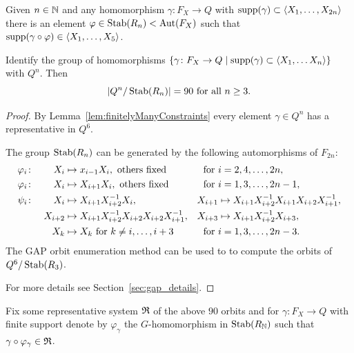 \documentclass[a4paper,11pt]{amsart}
\begin{document}
\begin{lem}\label{lem:finitelyManyConstraints}
 Given $n\in \mathbb{N}$ and any homomorphism $\gamma\colon F_X \to Q$ with $\operatorname{{supp}}(\gamma) \subset \left<X_1,\ldots ,X_{2n}\right>$
 there is an element $\varphi \in \operatorname{Stab}(R_n)<\operatorname{{Aut}}(F_X)$ such that $\operatorname{{supp}}(\gamma\circ\varphi) \in \left<X_1,\ldots,X_5\right>$.
\end{lem}
\begin{lem}\label{lem:90Constraints}
 Identify the group of homomorphisms $\{\gamma \colon F_X \to Q \mid \operatorname{{supp}}(\gamma) \subset \left<X_1,\ldots X_n\right>\}$ with $Q^n$. 
 Then \[\left|{Q^n/\operatorname{Stab}(R_n)}\right|=90 \text{ for all } n\geq 3	.\]
\end{lem}
\begin{proof}
By Lemma~\ref{lem:finitelyManyConstraints} every element $\gamma\in Q^n$ has a representative in $Q^6$.

 The group $\operatorname{Stab}(R_n)$ can be generated by the 
 following automorphisms of $F_{2n}$:
 \begin{align*}
  \varphi_i&\colon& X_i&\mapsto x_{i-1}X_i, \textup{ others fixed} & \textup{for }&i=2,4,\ldots,2n , \\
  \varphi_i&\colon&X_i&\mapsto X_{i+1}X_i, \textup{ others fixed} & \textup{for }&i=1,3,\ldots,2n-1 ,\\
  \psi_i&\colon&X_i&\mapsto X_{i+1}X_{i+2}^{-1}X_i, &X_{i+1}&\mapsto X_{i+1}X_{i+2}^{-1}X_{i+1}X_{i+2}X_{i+1}^{-1},\\  
  &&X_{i+2}&\mapsto X_{i+1}X_{i+2}^{-1}X_{i+2}X_{i+2}X_{i+1}^{-1}, &X_{i+3}&\mapsto X_{i+1}X_{i+2}^{-1}X_{i+3},\\
  &&X_k &\mapsto X_k \textup{ for } k\neq i,\ldots,i+3 & \textup{for }&i=1,3,\ldots,2n-3 .  
 \end{align*}
 The GAP orbit enumeration method  can be used to 
 to compute the orbits of ${Q^6/\operatorname{Stab}(R_3)}$.
 
 For more details see Section~\ref{sec:gap_details}.
\end{proof}
 Fix some representative system $\mathfrak{R}$ of the above $90$ orbits and for 
 $\gamma \colon F_X \to Q$ with finite support denote by $\varphi_\gamma$ the $G$-homomorphism in $\operatorname{Stab}(R_{\mathbb{N}})$ such that $\gamma\circ \varphi_\gamma \in \mathfrak{R}$.
 
\end{document}
